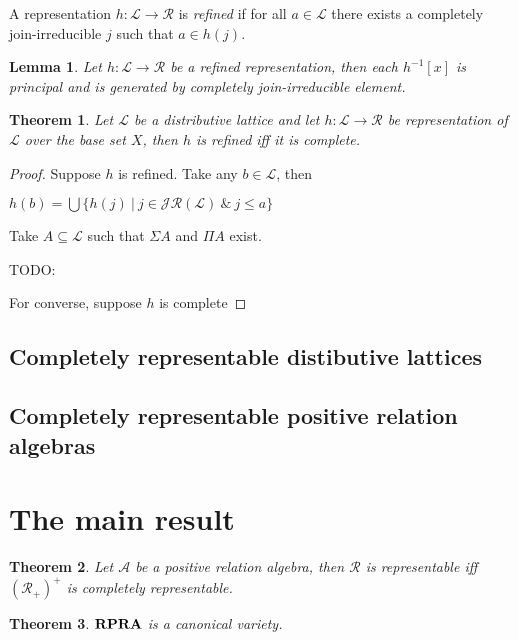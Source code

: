 \documentclass[a4paper]{article}
\theoremstyle{defin}
\theoremstyle{theorem}
\newtheorem{theorem}{Theorem}
\theoremstyle{claim}
\theoremstyle{prop}
\theoremstyle{lemma}
\newtheorem{lemma}{Lemma}
\theoremstyle{fact}
\theoremstyle{ex}
\theoremstyle{col}
\begin{document}
A representation $h : \mathcal{L} \to \mathcal{R}$ is \emph{refined} if for all $a \in \mathcal{L}$ there exists a completely join-irreducible $j$ such that $a \in h(j)$.

\begin{lemma}
Let $h : \mathcal{L} \to \mathcal{R}$ be a \emph{refined} representation, then each $h^{-1}[x]$ is principal and is generated by completely join-irreducible element.
\end{lemma}

\begin{theorem}
Let $\mathcal{L}$ be a distributive lattice and let $h : \mathcal{L} \to \mathcal{R}$ be representation of $\mathcal{L}$ over the base set $X$, then $h$ is refined iff it is complete.
\end{theorem}

\begin{proof}
Suppose $h$ is refined. Take any $b \in \mathcal{L}$, then
\begin{center}
$h(b) = \bigcup \{ h(j) \: | \: j \in \mathcal{JR}(\mathcal{L}) \: \& \: j \leq a \}$
\end{center}

Take $A \subseteq \mathcal{L}$ such that $\Sigma A$ and $\Pi A$ exist.

TODO:

For converse, suppose $h$ is complete
\end{proof}

\subsection{Completely representable distibutive lattices}

\subsection{Completely representable positive relation algebras}

\section{The main result}

\begin{theorem}
Let $\mathcal{A}$ be a positive relation algebra, then $\mathcal{R}$ is representable iff $(\mathcal{R}_{+})^{+}$ is completely representable.
\end{theorem}

\begin{theorem}
${\bf RPRA}$ is a canonical variety.
\end{theorem}
\end{document}
